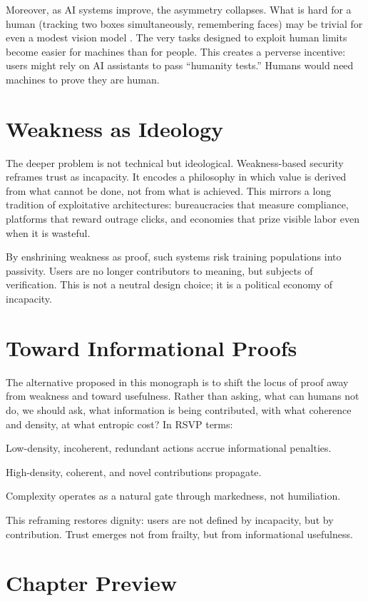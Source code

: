 \documentclass{book}
\begin{document}
Moreover, as AI systems improve, the asymmetry collapses. What is hard for a human (tracking two boxes simultaneously, remembering faces) may be trivial for even a modest vision model \cite{mnih2013, szegedy2014}. The very tasks designed to exploit human limits become easier for machines than for people. This creates a perverse incentive: users might rely on AI assistants to pass “humanity tests.” Humans would need machines to prove they are human.

\section{Weakness as Ideology}

The deeper problem is not technical but ideological. Weakness-based security reframes trust as incapacity. It encodes a philosophy in which value is derived from what cannot be done, not from what is achieved. This mirrors a long tradition of exploitative architectures: bureaucracies that measure compliance, platforms that reward outrage clicks, and economies that prize visible labor even when it is wasteful.

By enshrining weakness as proof, such systems risk training populations into passivity. Users are no longer contributors to meaning, but subjects of verification. This is not a neutral design choice; it is a political economy of incapacity.

\section{Toward Informational Proofs}

The alternative proposed in this monograph is to shift the locus of proof away from weakness and toward usefulness. Rather than asking, what can humans not do, we should ask, what information is being contributed, with what coherence and density, at what entropic cost? In RSVP terms:

Low-density, incoherent, redundant actions accrue informational penalties.

High-density, coherent, and novel contributions propagate.

Complexity operates as a natural gate through markedness, not humiliation.

This reframing restores dignity: users are not defined by incapacity, but by contribution. Trust emerges not from frailty, but from informational usefulness.

\section{Chapter Preview}
\end{document}
